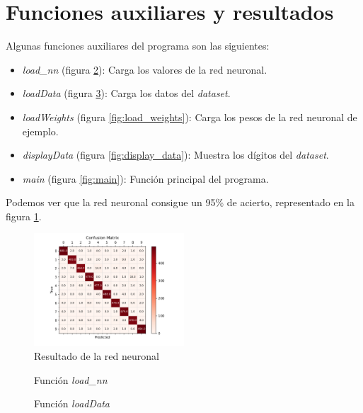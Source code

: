\documentclass[6pt]{AiTex}
\begin{document}
\section{Funciones auxiliares y resultados}

Algunas funciones auxiliares del programa son las siguientes:
\begin{itemize}
    \item \textit{load\_nn} (figura \ref{fig:load_nn}): Carga los valores de la red neuronal.
    \item \textit{loadData} (figura \ref{fig:load_data}): Carga los datos del \textit{dataset}.
    \item \textit{loadWeights} (figura \ref{fig:load_weights}): Carga los pesos de la red neuronal de ejemplo.
    \item \textit{displayData} (figura \ref{fig:display_data}): Muestra los dígitos del \textit{dataset}.
    \item \textit{main} (figura \ref{fig:main}): Función principal del programa.
\end{itemize}

Podemos ver que la red neuronal consigue un 95\% de acierto, representado en la figura \ref{fig:resultado}.

\begin{figure}[H]
    \centering
    \includegraphics[width=0.5\textwidth]{./imagenes/confusion_matrix.png}
    \caption{Resultado de la red neuronal}
    \label{fig:resultado}
\end{figure}

\begin{figure}[H]
    \centering
    
    \caption{Función \textit{load\_nn}}
    \label{fig:load_nn}
\end{figure}

\begin{figure}[H]
    \centering
    
    \caption{Función \textit{loadData}}
    \label{fig:load_data}
\end{figure}
\end{document}

